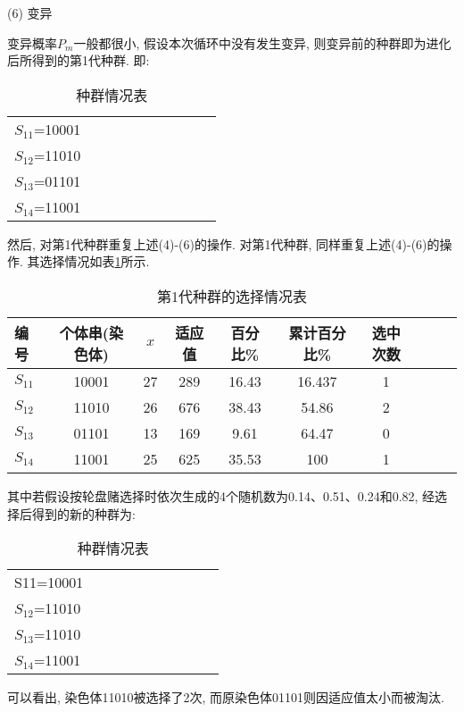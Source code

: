  (6) 变异

变异概率$P_m$一般都很小, 假设本次循环中没有发生变异, 则变异前的种群即为进化后所得到的第1代种群. 即:
\begin{table} [H]
\caption{种群情况表}
\begin{center}
\begin{tabular} {lccccccccc}
\hline
    $S_{11}$=10001\\
    $S_{12}$=11010\\
    $S_{13}$=01101\\
    $S_{14}$=11001\\
\hline
\end{tabular}
\end{center}
\end{table}

然后, 对第1代种群重复上述(4)-(6)的操作.
对第1代种群, 同样重复上述(4)-(6)的操作. 其选择情况如表\ref{AI_table2019112807}所示.
\begin{table} [H]
\caption{第1代种群的选择情况表}
\begin{center}
\begin{tabular} {lccccccccc}
  \hline
编号	&个体串(染色体)&	 $x$	&适应值	&百分比\%	&累计百分比\%	&选中次数\\
  \hline
$S_{11}$	&10001	&27	&289	&16.43	&16.437	&1\\
$S_{12}$&	11010	&26	&676&38.43	&54.86	&2\\
$S_{13}$&	01101	&13	&169	&9.61	&64.47	&0\\
$S_{14}$	&11001	&25	&625	&35.53	&100	&1\\
\hline
\end{tabular}
\end{center}
\label{AI_table2019112807}
\end{table}
其中若假设按轮盘赌选择时依次生成的4个随机数为0.14、0.51、0.24和0.82, 经选择后得到的新的种群为:
\begin{table} [H]
    \caption{种群情况表}
    \begin{center}
    \begin{tabular} {lccccccccc}
    \hline
    S11=10001\\
        $S_{12}$=11010\\
        $S_{13}$=11010\\
        $S_{14}$=11001\\
    \hline
    \end{tabular}
    \end{center}
\end{table}
可以看出, 染色体11010被选择了2次, 而原染色体01101则因适应值太小而被淘汰.

